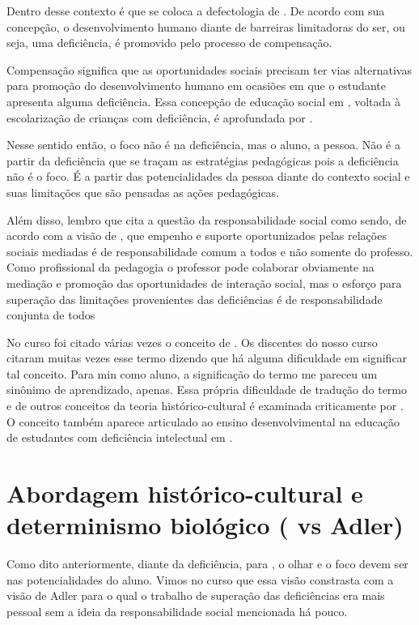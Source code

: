 \documentclass{../../common-shared/cls/Article_Class_RevInfor}
\begin{document}
Dentro desse contexto é que se coloca a defectologia de \Vig{}.  De acordo com sua concepção,
o desenvolvimento humano diante de barreiras limitadoras do ser, ou seja, uma deficiência, é promovido pelo processo de compensação.

Compensação significa que as oportunidades sociais
precisam ter vias alternativas para promoção do desenvolvimento humano
em ocasiões em que o estudante apresenta alguma deficiência. Essa
concepção de educação social em \Vig{}, voltada à escolarização de
crianças com deficiência, é aprofundada por .

Nesse sentido então, o foco não é na deficiência, mas o aluno, a pessoa. Não é a partir da deficiência que se traçam as estratégias pedagógicas pois a deficiência não é o foco. É a partir das potencialidades da pessoa diante do contexto social e suas limitações que são pensadas as ações pedagógicas.

Além disso, lembro que  cita a questão da responsabilidade social como sendo, de acordo com a visão de \Vig{}, que empenho e suporte oportunizados pelas relações sociais mediadas é de responsabilidade comum a todos e não somente do
professo. Como profissional da pedagogia o professor pode colaborar obviamente na mediação e promoção das oportunidades de interação social, mas o esforço para superação das limitações provenientes das deficiências é de responsabilidade conjunta de todos

No curso foi citado várias vezes o conceito de \Obtiene. Os discentes do nosso curso
citaram muitas vezes esse termo dizendo que há alguma dificuldade em significar tal conceito.
Para min como aluno, a significação do termo me pareceu um sinônimo de aprendizado, apenas.
Essa própria dificuldade de tradução do termo \Obtiene{} e de outros conceitos da
teoria histórico-cultural é examinada criticamente por
. O conceito também aparece articulado ao
ensino desenvolvimental na educação de estudantes com deficiência
intelectual em .

\section{Abordagem histórico-cultural e determinismo biológico (\Vig{} vs Adler)}

Como dito anteriormente, diante da deficiência, para \Vig{}, o olhar e o foco devem ser nas potencialidades do aluno. Vimos no curso que essa visão constrasta com a visão de Adler para o qual o trabalho de superação das deficiências era mais pessoal sem a ideia da responsabilidade social mencionada há pouco.
\end{document}
